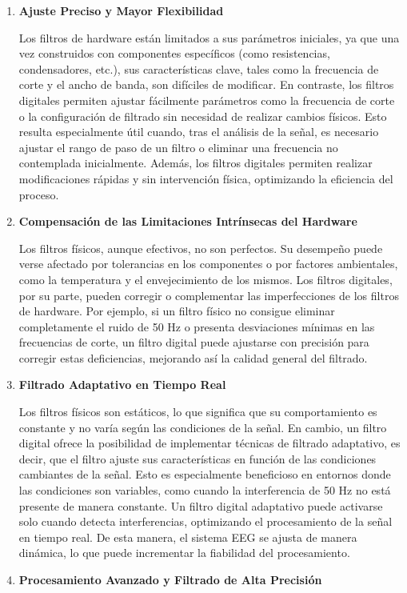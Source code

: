 \documentclass{article}
\begin{document}
\begin{enumerate}
    \item \textbf{Ajuste Preciso y Mayor Flexibilidad}
    
    Los filtros de hardware están limitados a sus parámetros iniciales, ya que una vez construidos con componentes específicos (como resistencias, condensadores, etc.), sus características clave, tales como la frecuencia de corte y el ancho de banda, son difíciles de modificar. En contraste, los filtros digitales permiten ajustar fácilmente parámetros como la frecuencia de corte o la configuración de filtrado sin necesidad de realizar cambios físicos. Esto resulta especialmente útil cuando, tras el análisis de la señal, es necesario ajustar el rango de paso de un filtro o eliminar una frecuencia no contemplada inicialmente. Además, los filtros digitales permiten realizar modificaciones rápidas y sin intervención física, optimizando la eficiencia del proceso.
    \item \textbf{Compensación de las Limitaciones Intrínsecas del Hardware}
    
    Los filtros físicos, aunque efectivos, no son perfectos. Su desempeño puede verse afectado por tolerancias en los componentes o por factores ambientales, como la temperatura y el envejecimiento de los mismos. Los filtros digitales, por su parte, pueden corregir o complementar las imperfecciones de los filtros de hardware. Por ejemplo, si un filtro físico no consigue eliminar completamente el ruido de 50 Hz o presenta desviaciones mínimas en las frecuencias de corte, un filtro digital puede ajustarse con precisión para corregir estas deficiencias, mejorando así la calidad general del filtrado.
    \item \textbf{Filtrado Adaptativo en Tiempo Real}
    
    Los filtros físicos son estáticos, lo que significa que su comportamiento es constante y no varía según las condiciones de la señal. En cambio, un filtro digital ofrece la posibilidad de implementar técnicas de filtrado adaptativo, es decir, que el filtro ajuste sus características en función de las condiciones cambiantes de la señal. Esto es especialmente beneficioso en entornos donde las condiciones son variables, como cuando la interferencia de 50 Hz no está presente de manera constante. Un filtro digital adaptativo puede activarse solo cuando detecta interferencias, optimizando el procesamiento de la señal en tiempo real. De esta manera, el sistema EEG se ajusta de manera dinámica, lo que puede incrementar la fiabilidad del procesamiento.
    \item \textbf{Procesamiento Avanzado y Filtrado de Alta Precisión}
    

\end{enumerate}
\end{document}
